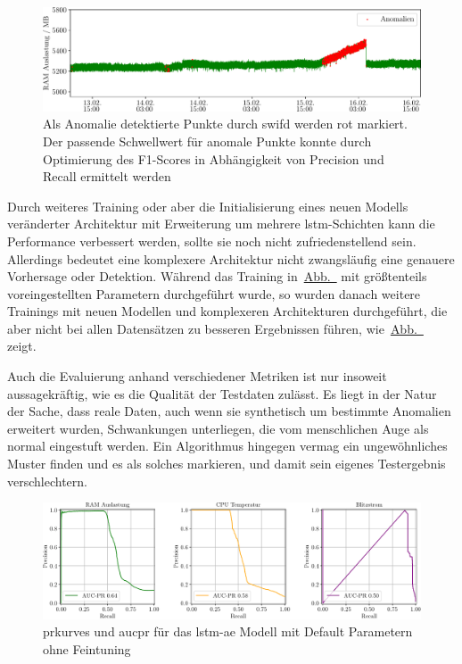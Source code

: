 \begin{figure}[t!]
    \centering
        \includegraphics[width=1\linewidth]{ch5_anomalieerkennung/abbildungen/SWIFD_Ergebnis_RAM.pdf}
    \caption{\centering Als Anomalie detektierte Punkte durch \acs*{swifd} werden rot markiert. Der passende Schwellwert für anomale Punkte konnte durch Optimierung
    des F1-Scores in Abhängigkeit von Precision und Recall ermittelt werden}
    \label{fig:SWIFD_visualisierung}
\end{figure}

Durch weiteres Training oder aber die Initialisierung eines neuen Modells veränderter Architektur mit Erweiterung um mehrere \ac{lstm}-Schichten
kann die Performance verbessert werden, sollte sie noch nicht zufriedenstellend sein. Allerdings bedeutet eine komplexere Architektur nicht zwangsläufig
eine genauere Vorhersage oder Detektion. Während das Training in~\hyperref[fig:LSTMAE_AUC_PR_1]{Abb.~} mit größtenteils
voreingestellten Parametern durchgeführt wurde, so wurden danach weitere Trainings mit neuen Modellen und komplexeren Architekturen durchgeführt,
die aber nicht bei allen Datensätzen zu besseren Ergebnissen führen, wie~\hyperref[fig:LSTMAE_AUC_PR_2]{Abb.~} zeigt.

Auch die Evaluierung anhand verschiedener Metriken ist nur insoweit aussagekräftig, wie es die Qualität der Testdaten zulässt. Es liegt in der Natur
der Sache, dass reale Daten, auch wenn sie synthetisch um bestimmte Anomalien erweitert wurden, Schwankungen unterliegen, die vom menschlichen Auge
als normal eingestuft werden. Ein Algorithmus hingegen vermag ein ungewöhnliches Muster finden und es als solches markieren, und damit sein eigenes
Testergebnis verschlechtern.

\begin{figure}[b!]
    \centering
        \includegraphics[width=1\linewidth]{ch5_anomalieerkennung/abbildungen/LSTMAE_PR_AUC_PR_1.pdf}
    \caption{\centering \acp*{prkurve} und \acs*{aucpr} für das \acs*{lstm-ae} Modell mit Default Parametern ohne Feintuning}
    \label{fig:LSTMAE_AUC_PR_1}
\end{figure}


